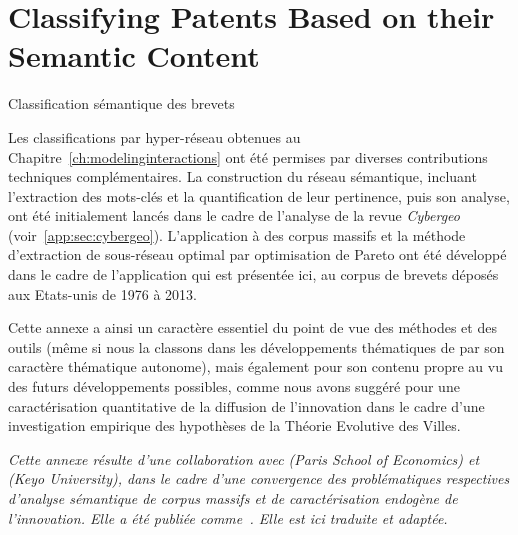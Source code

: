 


\section{Classifying Patents Based on their Semantic Content}{Classification sémantique des brevets}

\label{app:sec:patentsmining}


Les classifications par hyper-réseau obtenues au Chapitre~\ref{ch:modelinginteractions} ont été permises par diverses contributions techniques complémentaires. La construction du réseau sémantique, incluant l'extraction des mots-clés et la quantification de leur pertinence, puis son analyse, ont été initialement lancés dans le cadre de l'analyse de la revue \emph{Cybergeo} (voir~\ref{app:sec:cybergeo}). L'application à des corpus massifs et la méthode d'extraction de sous-réseau optimal par optimisation de Pareto ont été développé dans le cadre de l'application qui est présentée ici, au corpus de brevets déposés aux Etats-unis de 1976 à 2013.

Cette annexe a ainsi un caractère essentiel du point de vue des méthodes et des outils (même si nous la classons dans les développements thématiques de par son caractère thématique autonome), mais également pour son contenu propre au vu des futurs développements possibles, comme nous avons suggéré pour une caractérisation quantitative de la diffusion de l'innovation dans le cadre d'une investigation empirique des hypothèses de la Théorie Evolutive des Villes.


\stars


\textit{Cette annexe résulte d'une collaboration avec  (Paris School of Economics) et  (Keyo University), dans le cadre d'une convergence des problématiques respectives d'analyse sémantique de corpus massifs et de caractérisation endogène de l'innovation. Elle a été publiée comme~\cite{10.1371/journal.pone.0176310}. Elle est ici traduite et adaptée.}


\stars


